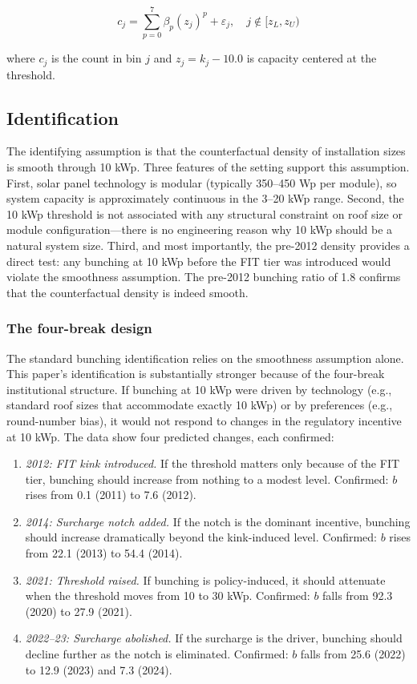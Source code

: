 \documentclass[12pt]{article}
\begin{document}
\begin{equation}
c_j = \sum_{p=0}^{7} \beta_p (z_j)^p + \varepsilon_j, \quad j \notin [z_L, z_U)
\end{equation}

where $c_j$ is the count in bin $j$ and $z_j = k_j - 10.0$ is capacity centered at the threshold.

\subsection{Identification}

The identifying assumption is that the counterfactual density of installation sizes is smooth through 10 kWp. Three features of the setting support this assumption. First, solar panel technology is modular (typically 350--450 Wp per module), so system capacity is approximately continuous in the 3--20 kWp range. Second, the 10 kWp threshold is not associated with any structural constraint on roof size or module configuration---there is no engineering reason why 10 kWp should be a natural system size. Third, and most importantly, the pre-2012 density provides a direct test: any bunching at 10 kWp before the FIT tier was introduced would violate the smoothness assumption. The pre-2012 bunching ratio of 1.8 confirms that the counterfactual density is indeed smooth.

\subsubsection*{The four-break design} The standard bunching identification relies on the smoothness assumption alone. This paper's identification is substantially stronger because of the four-break institutional structure. If bunching at 10 kWp were driven by technology (e.g., standard roof sizes that accommodate exactly 10 kWp) or by preferences (e.g., round-number bias), it would not respond to changes in the regulatory incentive at 10 kWp. The data show four predicted changes, each confirmed:

\begin{enumerate}
  \item \textit{2012: FIT kink introduced.} If the threshold matters only because of the FIT tier, bunching should increase from nothing to a modest level. Confirmed: $b$ rises from 0.1 (2011) to 7.6 (2012).
  \item \textit{2014: Surcharge notch added.} If the notch is the dominant incentive, bunching should increase dramatically beyond the kink-induced level. Confirmed: $b$ rises from 22.1 (2013) to 54.4 (2014).
  \item \textit{2021: Threshold raised.} If bunching is policy-induced, it should attenuate when the threshold moves from 10 to 30 kWp. Confirmed: $b$ falls from 92.3 (2020) to 27.9 (2021).
  \item \textit{2022--23: Surcharge abolished.} If the surcharge is the driver, bunching should decline further as the notch is eliminated. Confirmed: $b$ falls from 25.6 (2022) to 12.9 (2023) and 7.3 (2024).
\end{enumerate}
\end{document}
